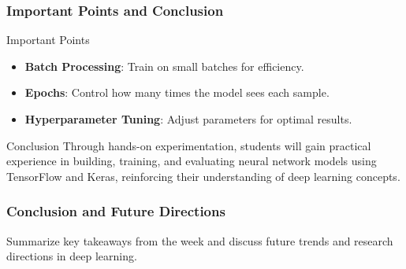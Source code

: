\documentclass{beamer}
\begin{document}
\begin{frame}
    \frametitle{Important Points and Conclusion}
    \begin{block}{Important Points}
        \begin{itemize}
            \item \textbf{Batch Processing}: Train on small batches for efficiency.
            \item \textbf{Epochs}: Control how many times the model sees each sample.
            \item \textbf{Hyperparameter Tuning}: Adjust parameters for optimal results.
        \end{itemize}
    \end{block}
    
    \begin{block}{Conclusion}
        Through hands-on experimentation, students will gain practical experience in building, training, and evaluating neural network models using TensorFlow and Keras, reinforcing their understanding of deep learning concepts.
    \end{block}
\end{frame}

\begin{frame}[fragile]
    \frametitle{Conclusion and Future Directions}
    Summarize key takeaways from the week and discuss future trends and research directions in deep learning.
\end{frame}
\end{document}
